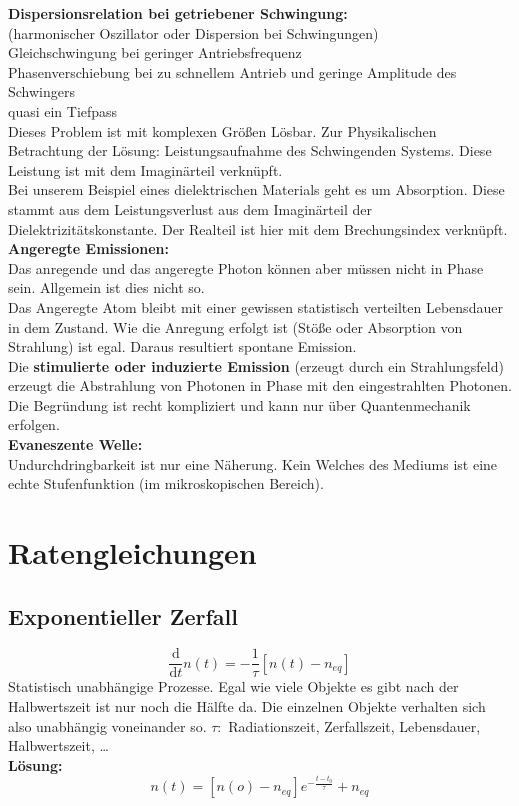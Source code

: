 \documentclass[titlepage,11pt,a4paper,ngerman]{report}
\newcommand{\tx}[1]{\textrm{#1}}
\newcommand{\prd}[2]{\frac{\tx{d} #1}{\tx{d} #2}}
\newcommand{\lcom}[1]{\color{MidnightBlue}#1\color{black}}
\begin{document}
\textbf{Dispersionsrelation bei getriebener Schwingung:}\\
(harmonischer Oszillator oder Dispersion bei Schwingungen)\\
Gleichschwingung bei geringer Antriebsfrequenz\\
Phasenverschiebung bei zu schnellem Antrieb und geringe Amplitude des Schwingers\\
quasi ein Tiefpass\\
Dieses Problem ist mit komplexen Größen Lösbar. Zur Physikalischen Betrachtung der Lösung: Leistungsaufnahme des Schwingenden Systems. Diese Leistung ist mit dem Imaginärteil verknüpft.\\
Bei unserem Beispiel eines dielektrischen Materials geht es um Absorption. Diese stammt aus dem Leistungsverlust aus dem Imaginärteil der Dielektrizitätskonstante. Der Realteil ist hier mit dem Brechungsindex verknüpft.\\[5pt]
\textbf{Angeregte Emissionen:}\\
Das anregende und das angeregte Photon können aber müssen nicht in Phase sein. Allgemein ist dies nicht so.\\
Das Angeregte Atom bleibt mit einer gewissen statistisch verteilten Lebensdauer in dem Zustand. Wie die Anregung erfolgt ist (Stöße oder Absorption von Strahlung) ist egal. Daraus resultiert spontane Emission.\\
Die \textbf{stimulierte oder induzierte Emission} (erzeugt durch ein Strahlungsfeld) erzeugt die Abstrahlung von Photonen in Phase mit den eingestrahlten Photonen. Die Begründung ist recht kompliziert und kann nur über Quantenmechanik erfolgen.\\[5pt]
\textbf{Evaneszente Welle:}\\
Undurchdringbarkeit ist nur eine Näherung. Kein Welches des Mediums ist eine echte Stufenfunktion (im mikroskopischen Bereich).


\section{Ratengleichungen}

\subsection{Exponentieller Zerfall}

\begin{equation*}
\prd{}{t} n(t) = - \frac{1}{\tau} [n(t) - n_{eq} ]
\end{equation*}
\lcom{Statistisch unabhängige Prozesse. Egal wie viele Objekte es gibt nach der Halbwertszeit ist nur noch die Hälfte da. Die einzelnen Objekte verhalten sich also unabhängig voneinander so.}
$ \tau : $ Radiationszeit, Zerfallszeit, Lebensdauer, Halbwertszeit, \dots\\
\textbf{Lösung:}
\begin{equation*}
n(t) = [n(o) - n_{eq}] e^{-\frac{t - t_0}{\tau}} + n_{eq}
\end{equation*}
\end{document}
